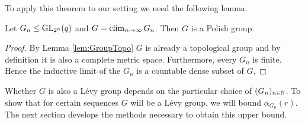 To apply this theorem to our setting we need the following lemma.
\begin{lemma}
Let $G_n\leq\operatorname{GL}_{2^n}(q)$ and $G=\operatorname{clim}\limits_{n\to\infty} G_n$. Then $G$ is a Polish group. 
\end{lemma}
\begin{proof}
By Lemma \ref{lem:GroupTopo} $G$ is already a topological group and by definition it is also a complete metric space. Furthermore, every $G_n$ is finite. Hence the inductive limit of the $G_n$ is a countable dense subset of $G$.
\end{proof}

Whether $G$ is also a L\'evy group depends on the particular choice of $(G_n)_{n\in\mathbb{N}}$. 
To show that for certain sequences $G$ will be a L\'evy group, we will bound $\alpha_{G_n}(r)$. 
The next section develops the methods necessary to obtain this upper bound.

